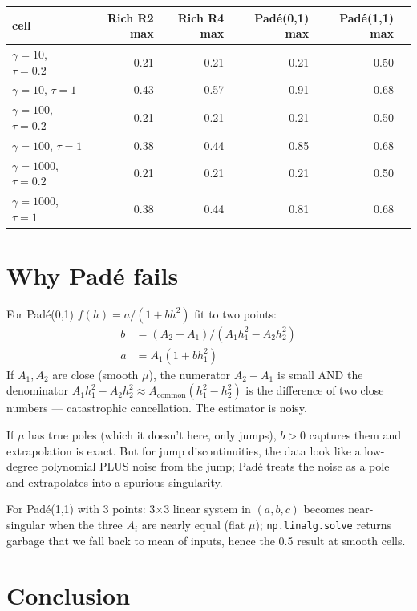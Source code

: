 \documentclass[11pt]{article}
\begin{document}
\begin{center}
\begin{tabular}{lrrrrr}
\toprule
cell & Rich R2 max & Rich R4 max & Pad\'e(0,1) max & Pad\'e(1,1) max \\
\midrule
$\gamma{=}10$, $\tau{=}0.2$  & 0.21 & 0.21 & 0.21 & 0.50 \\
$\gamma{=}10$, $\tau{=}1$    & 0.43 & 0.57 & 0.91 & 0.68 \\
$\gamma{=}100$, $\tau{=}0.2$ & 0.21 & 0.21 & 0.21 & 0.50 \\
$\gamma{=}100$, $\tau{=}1$   & 0.38 & 0.44 & 0.85 & 0.68 \\
$\gamma{=}1000$, $\tau{=}0.2$ & 0.21 & 0.21 & 0.21 & 0.50 \\
$\gamma{=}1000$, $\tau{=}1$  & 0.38 & 0.44 & 0.81 & 0.68 \\
\bottomrule
\end{tabular}
\end{center}

\section{Why Pad\'e fails}

For Pad\'e(0,1) $f(h) = a / (1 + b h^2)$ fit to two points:
\begin{align*}
b &= (A_2 - A_1) / (A_1 h_1^2 - A_2 h_2^2) \\
a &= A_1 (1 + b h_1^2)
\end{align*}
If $A_1, A_2$ are close (smooth $\mu$), the numerator $A_2 - A_1$ is
small AND the denominator $A_1 h_1^2 - A_2 h_2^2 \approx
A_\mathrm{common}(h_1^2 - h_2^2)$ is the difference of two close
numbers --- catastrophic cancellation. The estimator is noisy.

If $\mu$ has true poles (which it doesn't here, only jumps),
$b > 0$ captures them and extrapolation is exact. But for jump
discontinuities, the data look like a low-degree polynomial PLUS noise
from the jump; Pad\'e treats the noise as a pole and extrapolates
into a spurious singularity.

For Pad\'e(1,1) with 3 points: 3$\times$3 linear system in $(a, b, c)$
becomes near-singular when the three $A_i$ are nearly equal (flat $\mu$);
\texttt{np.linalg.solve} returns garbage that we fall back to mean of
inputs, hence the 0.5 result at smooth cells.

\section{Conclusion}
\end{document}
